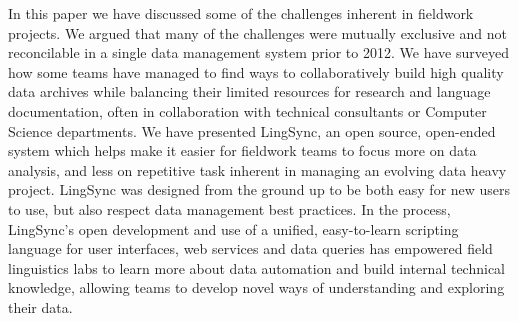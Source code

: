 \documentclass[letterpaper, 12pt, dvips]{mitwpl}
\begin{document}
In this paper we have discussed some of the challenges inherent in fieldwork projects. 
We argued that many of the challenges were mutually exclusive and not reconcilable in a single data management system prior to 2012. 
We have surveyed how some teams have managed to find ways to collaboratively build high quality data archives while balancing  their limited resources for research and language documentation, often in collaboration with technical consultants or Computer Science departments. 
We have presented LingSync, an open source, open-ended system which helps make it easier for fieldwork teams to focus more on data analysis,  and less on 
 repetitive task inherent in managing an evolving data heavy project. 
LingSync was designed from the ground up to be both easy for new users to use, but also respect data management best practices. In the process, LingSync's open development and use of a unified, easy-to-learn scripting language for user interfaces, web services and data queries has empowered field linguistics labs to learn more about data automation and build internal technical knowledge, allowing teams to develop novel ways of understanding and exploring their data. %




\custombib{}
\end{document}
